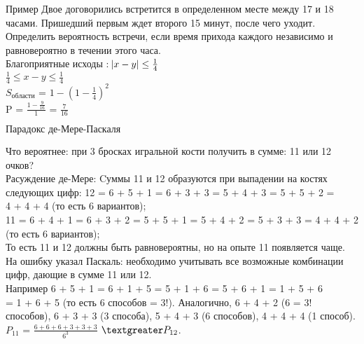 \documentclass[russian, 12pt]{article}
\begin{document}
$\textbf{Пример}$ Двое договорились встретится в определенном месте между 17 и 18 часами. Пришедший первым ждет второго 15 минут, после чего уходит. Определить вероятность встречи, если время прихода каждого независимо и равновероятно в течении этого часа.\\
Благоприятные исходы : $\abs{x - y} \leq \frac{1}{4}$\\
$\frac{1}{4} \leq x - y \leq \frac{1}{4}$\\	
$S_{области}$ = $1 - {(1 - \frac{1}{4})}^2$\\
P = $\frac{1 - \frac{9}{16}}{1}$ = $\frac{7}{16}$
\begin{center}
$\textbf{Парадокс де-Мере-Паскаля }$
\end{center}
Что вероятнее: при 3 бросках игральной кости получить в сумме: 11 или 12 очков?\\
Расуждение де-Мере: Cуммы 11 и 12 образуются при выпадении на костях следующих цифр: 12 =  6 +  5 + 1 = 6 + 3 + 3 = 5 + 4 + 3 = 5 + 5 + 2 = \\
4 + 4 + 4 (то есть 6 вариантов);\\
11 =  6 + 4 + 1 = 6 + 3 + 2 = 5 + 5 + 1 = 5 + 4 + 2 = 5 + 3 + 3 = 4 + 4 + 2 (то есть 6 вариантов);\\
То есть 11 и 12 должны быть равновероятны, но на опыте 11 появляется чаще.\\
На ошибку указал Паскаль: необходимо учитывать все возможные комбинации цифр, дающие в сумме 11 или 12.\\
Например 6 + 5 + 1 = 6 + 1 + 5 = 5 + 1 + 6 = 5 +  6 + 1 = 1 + 5 + 6\\
= 1 + 6 + 5 (то есть 6 способов = 3!). Аналогично, 6 + 4 + 2  (6 = 3! способов), 6 + 3 +  3 (3 способа), 5 + 4 + 3 (6 способов), 4 + 4 + 4 (1 способ).\\
$P_{11}$ = $\frac{6 +  6 + 6 + 3 + 3 + 3}{6^3}$  $\textgreater P_{12}$.\\
\end{document}
